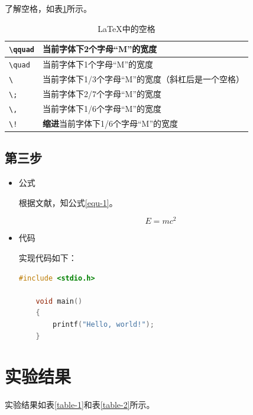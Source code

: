 \documentclass[a4paper, 12pt]{article}
\begin{document}
了解空格，如表\ref{table-space}所示。

\begin{table}[ht!]
    \centering
    \caption{\LaTeX{}中的空格}
    \label{table-space}
    \begin{tabular}{l|l}
        \hline
        \verb|\qquad| & 当前字体下2个字母“M”的宽度 \\ \hline
        \verb|\quad|  & 当前字体下1个字母“M”的宽度 \\ \hline
        \verb|\ |     & 当前字体下1/3个字母“M”的宽度（斜杠后是一个空格） \\ \hline
        \verb|\;|     & 当前字体下2/7个字母“M”的宽度 \\ \hline
        \verb|\,|     & 当前字体下1/6个字母“M”的宽度 \\ \hline
        \verb|\!|     & {\bf 缩进}当前字体下1/6个字母“M”的宽度 \\ \hline
    \end{tabular}
\end{table}

\subsection{第三步}

\begin{itemize}

    \item 公式

    根据文献\cite{ref-2}，知公式\ref{equ-1}。

    \begin{equation}
        \label{equ-1}
        E=mc^2
    \end{equation}

    \item 代码

    实现代码如下：

    \begin{lstlisting}[language={C}]
    #include <stdio.h>

    void main()
    {
        printf("Hello, world!");
    }
    \end{lstlisting}

\end{itemize}


\section{实验结果}

实验结果如表\ref{table-1}和表\ref{table-2}所示。
\end{document}
